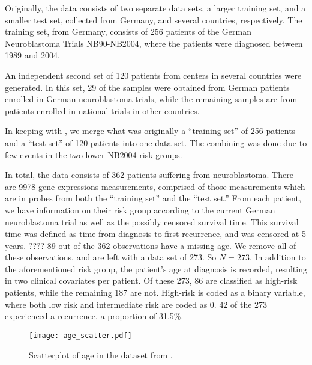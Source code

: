 Originally, the data consists of two separate data sets, a larger training set, and a smaller test set, collected from Germany, and several countries, respectively.
The training set, from Germany, consists of 256 patients of the German Neuroblastoma Trials NB90-NB2004, where the patients were diagnosed between 1989 and 2004.

An independent second set of 120 patients from centers in several countries were generated.
In this set, 29 of the samples were obtained from German patients enrolled in German neuroblastoma trials, while the remaining samples are from patients enrolled in national trials in other countries.

In keeping with \citet{bovelstad2009}, we merge what was originally a ``training set'' of 256 patients and a ``test set'' of 120 patients into one data set.
The combining was done due to few events in the two lower NB2004 risk groups.

In total, the data consists of 362 patients suffering from neuroblastoma.
There are 9978 gene expressions measurements, comprised of those measurements which are in probes from both the ``training set'' and the ``test set.''
From each patient, we have information on their risk group according to the current German neuroblastoma trial as well as the possibly censored survival time.
This survival time was defined as time from diagnosis to first recurrence, and was censored at 5 years. ????
89 out of the 362 observations have a missing age.
We remove all of these observations, and are left with a data set of 273.
So $N=273$.
In addition to the aforementioned risk group, the patient's age at diagnosis is recorded, resulting in two clinical covariates per patient.
Of these 273, 86 are classified as high-risk patients, while the remaining 187 are not.
High-risk is coded as a binary variable, where both low risk and intermediate risk are coded as 0.
42 of the 273 experienced a recurrence, a proportion of 31.5\%.

\begin{figure}\label{fig:age-scatter}
\caption{Scatterplot of age in the dataset from \citet{oberthuer-data}.}
\centering\texttt{[image: age\_scatter.pdf]}
\end{figure}

